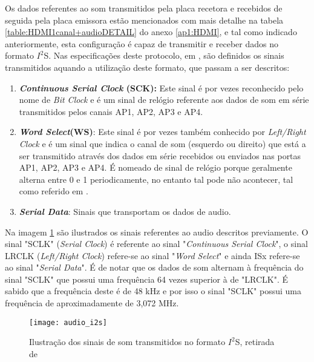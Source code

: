 Os dados referentes ao som transmitidos pela placa recetora e recebidos de seguida pela placa emissora estão mencionados com mais detalhe na tabela \ref{table:HDMI1canal+audioDETAIL} do anexo \ref{ap1:HDMI}, e tal como indicado anteriormente, esta configuração é capaz de transmitir e receber dados no formato $I^{2}$S. Nas especificações deste protocolo, em \cite{R027}, são definidos os sinais transmitidos aquando a utilização deste formato, que passam a ser descritos:

\begin{enumerate}
	\item \textbf{\textit{Continuous Serial Clock} (SCK):} Este sinal é por vezes reconhecido pelo nome de \textit{Bit Clock} e é um sinal de relógio referente aos dados de som em série transmitidos pelos canais AP1, AP2, AP3 e AP4.
	
	\item \textbf{\textit{Word Select}(WS)}: Este sinal é por vezes também conhecido por \textit{Left/Right Clock} e é um sinal que indica o canal de som (esquerdo ou direito) que está a ser transmitido através dos dados em série recebidos ou enviados nas portas AP1, AP2, AP3 e AP4. É nomeado de sinal de relógio porque geralmente alterna entre 0 e 1 periodicamente, no entanto tal pode não acontecer, tal como referido em \cite{R027}. 
	
	\item \textbf{\textit{Serial Data}}: Sinais que transportam os dados de audio.

\end{enumerate}

Na imagem \ref{fig:i2s_audio} são ilustrados os sinais referentes ao audio descritos previamente. O sinal "SCLK" (\textit{Serial Clock}) é referente ao sinal "\textit{Continuous Serial Clock}", o sinal LRCLK (\textit{Left/Right Clock}) refere-se ao sinal "\textit{Word Select}" e ainda ISx refere-se ao sinal "\textit{Serial Data}". É de notar que os dados de som alternam à frequência do sinal "SCLK" que possui uma frequência 64 vezes superior à de "LRCLK". É sabido que a frequência deste é de 48 kHz e por isso o sinal "SCLK" possui uma frequência de aproximadamente de 3,072 MHz.

\begin{figure}[h!]
	\begin{center}
		\leavevmode
		\texttt{[image: audio\_i2s]}
		\caption{Ilustração dos sinais de som transmitidos no formato $I^{2}$S, retirada de \cite{R016}}
		\label{fig:i2s_audio}
	\end{center}
\end{figure}

